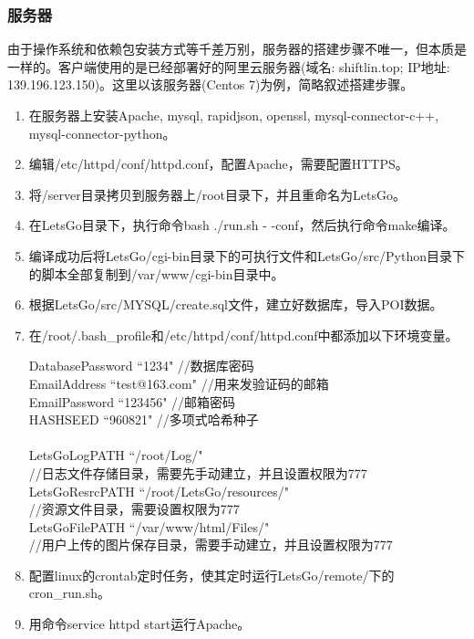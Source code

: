 \documentclass[UTF8]{article}
\begin{document}
\subsubsection{服务器}
由于操作系统和依赖包安装方式等千差万别，服务器的搭建步骤不唯一，但本质是一样的。客户端使用的是已经部署好的阿里云服务器(域名: shiftlin.top; IP地址: 139.196.123.150)。这里以该服务器(Centos 7)为例，简略叙述搭建步骤。
\begin{enumerate}
    \item 在服务器上安装Apache, mysql, rapidjson, openssl, mysql-connector-c++, mysql-connector-python。
    \item 编辑/etc/httpd/conf/httpd.conf，配置Apache，需要配置HTTPS。
    \item 将/server目录拷贝到服务器上/root目录下，并且重命名为LetsGo。
    \item 在LetsGo目录下，执行命令bash ./run.sh - -conf，然后执行命令make编译。
    \item 编译成功后将LetsGo/cgi-bin目录下的可执行文件和LetsGo/src/Python目录下的脚本全部复制到/var/www/cgi-bin目录中。
    \item 根据LetsGo/src/MYSQL/create.sql文件，建立好数据库，导入POI数据。
    \item 在/root/.bash\_profile和/etc/httpd/conf/httpd.conf中都添加以下环境变量。\\
    \begin{tcolorbox}[colback=white]
        DatabasePassword ``1234" //数据库密码\\
        EmailAddress ``test@163.com" //用来发验证码的邮箱\\
        EmailPassword ``123456" //邮箱密码\\
        HASHSEED ``960821" //多项式哈希种子\\
        \\
        LetsGoLogPATH ``/root/Log/" \\
        //日志文件存储目录，需要先手动建立，并且设置权限为777\\
        LetsGoResrcPATH ``/root/LetsGo/resources/"\\
        //资源文件目录，需要设置权限为777\\
        LetsGoFilePATH ``/var/www/html/Files/" \\
        //用户上传的图片保存目录，需要手动建立，并且设置权限为777
    \end{tcolorbox}
    \item 配置linux的crontab定时任务，使其定时运行LetsGo/remote/下的cron\_run.sh。
    \item 用命令service httpd start运行Apache。
\end{enumerate}
\end{document}
